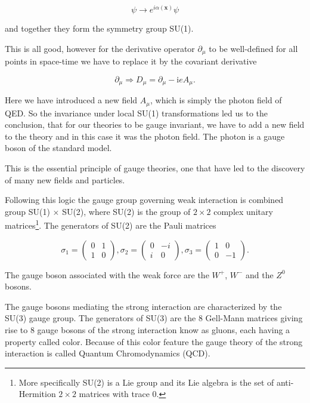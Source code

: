 \begin{equation} \label{eq:localphase}
    \psi \rightarrow e^{i\alpha(\mathbf{x})} \psi
\end{equation}

and together they form the symmetry group SU(1).

This is all good, however for the derivative operator $\partial_\mu$ to be well-defined for all points in space-time we have to replace it by the covariant derivative

\begin{equation} \label{eq:covariant}
	\partial_\mu \Rightarrow D_\mu = \partial_\mu - \textrm{i}e A_\mu.
\end{equation}

Here we have introduced a new field $A_\mu$, which is simply the photon field of QED. So the invariance under local SU(1) transformations led us to the conclusion, that for our theories to be gauge invariant, we have to add a new field to the theory and in this case it was the photon field. The photon is a gauge boson of the standard model.

This is the essential principle of gauge theories, one that have led to the discovery of many new fields and particles.

Following this logic the gauge group governing weak interaction is combined group SU(1) $\times$ SU(2), where SU(2) is the group of $2 \times 2$ complex unitary matrices\footnote{More specifically SU(2) is a Lie group and its Lie algebra is the set of anti-Hermition $2 \times 2$ matrices with trace 0.}. The generators of SU(2) are the Pauli matrices

\begin{equation}
	\sigma_1 =
	\begin{pmatrix}
	0&1\\
	1&0
	\end{pmatrix},
	\sigma_2 = 
	\begin{pmatrix}
	0&-i\\
	i&0
	\end{pmatrix},
	\sigma_3 = 
	\begin{pmatrix}
	1&0\\
	0&-1
	\end{pmatrix}.
\end{equation}

The gauge boson associated with the weak force are the $W^+$, $W^-$ and the $Z^0$ bosons.

The gauge bosons mediating the strong interaction are characterized by the SU(3) gauge group. The generators of SU(3) are the 8 Gell-Mann matrices giving rise to 8 gauge bosons of the strong interaction know as gluons, each having a property called color. Because of this color feature the gauge theory of the strong interaction is called Quantum Chromodynamics (QCD).

